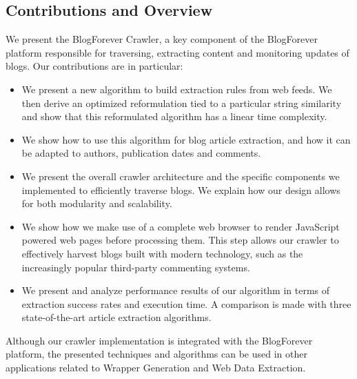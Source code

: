 \subsection{Contributions and Overview}
We present the BlogForever Crawler, a key component of the BlogForever platform responsible for traversing, extracting content and monitoring updates of blogs. Our contributions are in particular:

\begin{itemize}
  \item We present a new algorithm to build extraction rules from web feeds. We then derive an optimized reformulation tied to a particular string similarity and show that this reformulated algorithm has a linear time complexity.
  \item We show how to use this algorithm for blog article extraction, and how it can be adapted to authors, publication dates and comments.
  \item We present the overall crawler architecture and the specific components we implemented to efficiently traverse blogs. We explain how our design allows for both modularity and scalability.
  \item We show how we make use of a complete web browser to render JavaScript powered web pages before processing them. This step allows our crawler to effectively harvest blogs built with modern technology, such as the increasingly popular third-party commenting systems.
  \item We present and analyze performance results of our algorithm in terms of extraction success rates and execution time. A comparison is made with three state-of-the-art article extraction algorithms.
\end{itemize}

Although our crawler implementation is integrated with the BlogForever platform, the presented techniques and algorithms can be used in other applications related to Wrapper Generation and Web Data Extraction.
